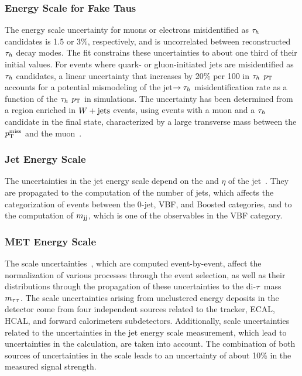 \subsubsection{Energy Scale for Fake Taus}
The energy scale uncertainty for muons or electrons
misidentified as $\tau_{h}$ candidates is 1.5 or 3\%, respectively, and is uncorrelated between reconstructed $\tau_{h}$ decay
modes. The fit constrains these uncertainties to about one third of their initial values. For events where quark- or 
gluon-initiated jets are misidentified as $\tau_{h}$ candidates, a linear uncertainty that increases by 20\% per 100\GeV 
in $\tau_{h}$ $p_\mathrm{T}$ accounts for a potential mismodeling of the jet$\to\tau_{h}$ misidentification rate as a
function of the $\tau_{h}$ $p_\mathrm{T}$ in simulations. The uncertainty has been determined from a region enriched in $W+\text{jets}$ 
events, using events with a muon and a $\tau_{h}$ candidate in the final state, characterized by a large transverse mass 
between the $p_\mathrm{T}^\text{miss}$ and the muon~\cite{Khachatryan:2015dfa,CMS-PAS-TAU-16-002}.

\subsubsection{Jet Energy Scale}
The uncertainties in the jet energy scale depend on the \pt and $\eta$ of the jet~\cite{CMS-JME-10-011}.
They are propagated to the computation of the number of jets, which affects the categorization of events between the 0-jet, 
VBF, and Boosted categories, and to the computation of $m_\mathrm{jj}$, which is one of the observables in the VBF category.

\subsubsection{MET Energy Scale}
The \etvecmiss scale uncertainties~\cite{CMS-JME-12-002}, which are computed event-by-event, affect the normalization of 
various processes through the event selection, as well as their distributions through the propagation of these uncertainties 
to the di-$\tau$ mass $m_{\tau\tau}$. The \etvecmiss scale uncertainties arising from unclustered energy deposits in the detector 
come from four independent sources related to the tracker, ECAL, HCAL, and forward calorimeters subdetectors. Additionally, 
\etvecmiss scale uncertainties related to the uncertainties in the jet energy scale measurement, which lead to 
uncertainties in the \etvecmiss calculation, are taken into account. The combination of both sources of uncertainties in 
the \etvecmiss scale leads to an uncertainty of about 10\% in the measured signal strength.



